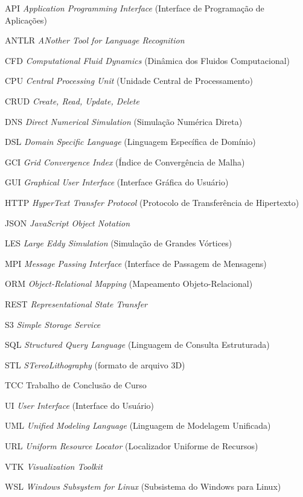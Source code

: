 \begin{siglas}
  \item[API] \textit{Application Programming Interface} (Interface de Programação de Aplicações)
  \item[ANTLR] \textit{ANother Tool for Language Recognition}
  \item[CFD] \textit{Computational Fluid Dynamics} (Dinâmica dos Fluidos Computacional)
  \item[CPU] \textit{Central Processing Unit} (Unidade Central de Processamento)
  \item[CRUD] \textit{Create, Read, Update, Delete}
  \item[DNS] \textit{Direct Numerical Simulation} (Simulação Numérica Direta)
  \item[DSL] \textit{Domain Specific Language} (Linguagem Específica de Domínio)
  \item[GCI] \textit{Grid Convergence Index} (Índice de Convergência de Malha)
  \item[GUI] \textit{Graphical User Interface} (Interface Gráfica do Usuário)
  \item[HTTP] \textit{HyperText Transfer Protocol} (Protocolo de Transferência de Hipertexto)
  \item[JSON] \textit{JavaScript Object Notation}
  \item[LES] \textit{Large Eddy Simulation} (Simulação de Grandes Vórtices)
  \item[MPI] \textit{Message Passing Interface} (Interface de Passagem de Mensagens)
  \item[ORM] \textit{Object-Relational Mapping} (Mapeamento Objeto-Relacional)
  \item[REST] \textit{Representational State Transfer}
  \item[S3] \textit{Simple Storage Service}
  \item[SQL] \textit{Structured Query Language} (Linguagem de Consulta Estruturada)
  \item[STL] \textit{STereoLithography} (formato de arquivo 3D)
  \item[TCC] Trabalho de Conclusão de Curso
  \item[UI] \textit{User Interface} (Interface do Usuário)
  \item[UML] \textit{Unified Modeling Language} (Linguagem de Modelagem Unificada)
  \item[URL] \textit{Uniform Resource Locator} (Localizador Uniforme de Recursos)
  \item[VTK] \textit{Visualization Toolkit}
  \item[WSL] \textit{Windows Subsystem for Linux} (Subsistema do Windows para Linux)
\end{siglas}

